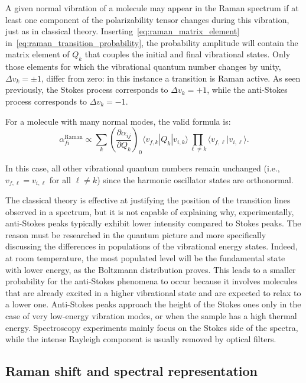 A given normal vibration of a molecule may appear
in the Raman spectrum if at least one component of
the polarizability tensor changes during this vibration,
just as in classical theory.
Inserting~\eqref{eq:raman_matrix_element} in~\eqref{eq:raman_transition_probability}, the probability amplitude will contain the matrix element of \(Q_k\) that couples the initial and final vibrational states. Only those elements for which the vibrational quantum number changes by unity, \(\Delta v_k=\pm 1\), differ from zero: in this instance a transition is Raman active. As seen previously, the Stokes process corresponds to \(\Delta v_k=+1\), while the anti-Stokes process corresponds to \(\Delta v_k=-1\).

For a molecule with many normal modes, the valid formula is:
\begin{equation}
    \alpha_{fi}^{\mathrm{Raman}} \propto
    \sum_k
    \left(\frac{\partial \alpha_{ij}}{\partial Q_k}\right)_0
    \langle v_{f,k}|Q_k|v_{i,k}\rangle
    \prod_{\ell\neq k}
    \langle v_{f,\ell}|v_{i,\ell}\rangle .
    \label{eq:raman_matrix_element_multimode}
\end{equation}

In this case, all other vibrational quantum numbers remain unchanged (i.e., \(v_{f,\ell} = v_{i,\ell}\) for all \(\ell \neq k\)) since the harmonic oscillator states are orthonormal. 

The classical theory is effective at justifying the position of the transition lines observed in a spectrum, but it is not capable of explaining why, experimentally, anti-Stokes peaks typically exhibit lower intensity compared to Stokes peaks. The reason must be researched in the quantum picture and more specifically discussing the differences in populations of the vibrational energy states. Indeed, at room temperature, the most populated level will be the fundamental state with lower energy, as the Boltzmann distribution proves. This leads to a smaller probability for the anti-Stokes phenomena to occur because it involves molecules that are already excited in a higher vibrational state and are expected to relax to a lower one.
Anti-Stokes peaks approach the height of the Stokes ones only in the case of very low-energy vibration modes, or
when the sample has a high thermal energy. Spectroscopy experiments mainly focus on the Stokes side of the spectra, while the intense Rayleigh component is usually removed by optical filters.

\subsection{Raman shift and spectral representation}
\label{subsec:raman_shifts}

